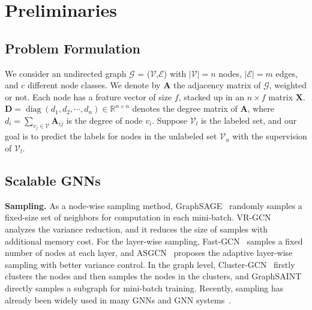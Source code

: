 \documentclass[sigconf]{acmart}
\begin{document}
\section{Preliminaries}
\subsection{Problem Formulation} 
We consider an undirected graph $\mathcal{G}$ = ($\mathcal{V}$,$\mathcal{E}$) with $|\mathcal{V}| = n$ nodes, $|\mathcal{E}| = m$ edges, and $c$ different node classes. We denote by $\mathbf{A}$ the adjacency matrix of $\mathcal{G}$, weighted or not. 
Each node has a feature vector of size $f$, stacked up in an $n \times f$ matrix $\mathbf{X}$. $\mathbf{D}=\operatorname{diag}\left(d_{1}, d_{2}, \cdots, d_{n}\right) \in \mathbb{R}^{n \times n}$ denotes the degree matrix of $\mathbf{A}$, where $d_{i}=\sum_{v_{j} \in \mathcal{V}} \mathbf{A}_{i j}$ is the degree of node $v_{i}$. 
Suppose $\mathcal{V}_l$ is the labeled set, and our goal is to predict the labels for nodes in the unlabeled set $\mathcal{V}_u$ with the supervision of $\mathcal{V}_l$.

\subsection{Scalable GNNs}
\textbf{Sampling.} 
As a node-wise sampling method, GraphSAGE~\citep{hamilton2017inductive} randomly samples a fixed-size set of neighbors for computation in each mini-batch. VR-GCN~\citep{DBLP:conf/icml/ChenZS18} analyzes the variance reduction, and it reduces the size of samples with additional memory cost.
For the layer-wise sampling, Fast-GCN~\citep{DBLP:conf/iclr/ChenMX18} samples a fixed number of nodes at each layer, and ASGCN~\citep{DBLP:conf/nips/Huang0RH18} proposes the adaptive layer-wise sampling with better variance control.
In the graph level, Cluster-GCN~\citep{chiang2019cluster} firstly clusters the nodes and then samples the nodes in the clusters, and GraphSAINT~\citep{DBLP:conf/iclr/ZengZSKP20} directly samples a subgraph for mini-batch training. 
Recently, sampling has already been widely used in many GNNs and GNN systems~\citep{distdgl_ai3_2020, aligraph_vldb_2019, pygeometric_iclr_2019}.
\end{document}
